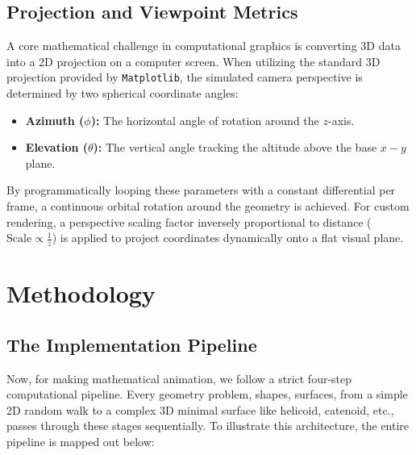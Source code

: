 \documentclass[12pt, a4paper]{report}
\begin{document}
\section{Projection and Viewpoint Metrics}
A core mathematical challenge in computational graphics is converting 3D data into a 2D projection on a computer screen. When utilizing the standard 3D projection provided by \texttt{Matplotlib}, the simulated camera perspective is determined by two spherical coordinate angles:
\begin{itemize}
    \item \textbf{Azimuth ($\phi$):} The horizontal angle of rotation around the $z$-axis.
    \item \textbf{Elevation ($\theta$):} The vertical angle tracking the altitude above the base $x-y$ plane.
\end{itemize}
By programmatically looping these parameters with a constant differential per frame, a continuous orbital rotation around the geometry is achieved. For custom rendering, a perspective scaling factor inversely proportional to distance ($\text{Scale} \propto \frac{1}{z}$) is applied to project coordinates dynamically onto a flat visual plane.


\chapter{Methodology}

\section{The Implementation Pipeline}

Now, for making mathematical animation, we follow a strict four-step computational pipeline. Every geometry problem, shapes, surfaces, from a simple 2D random walk to a complex 3D minimal surface like helicoid, catenoid, etc., passes through these stages sequentially. To illustrate this architecture, the entire pipeline is mapped out below:

\vspace{0.5cm}
\end{document}
